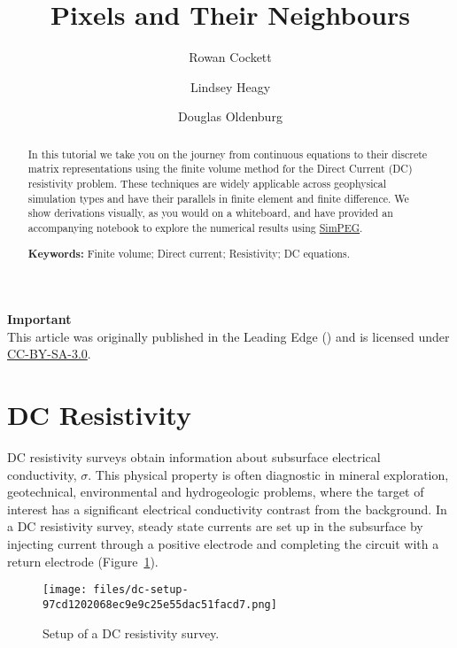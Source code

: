 \documentclass[Journal,InsideFigs,DoubleSpace,12pt,letterpaper]{ascelike-new}
\begin{document}
\title{Pixels and Their Neighbours}

\author[1]{Rowan Cockett}\author[1]{Lindsey Heagy}\author[1]{Douglas Oldenburg}

\maketitle

\begin{abstract}
In this tutorial we take you on the journey from continuous equations to their discrete matrix representations using the finite volume method for the Direct Current (DC) resistivity problem. These techniques are widely applicable across geophysical simulation types and have their parallels in finite element and finite difference. We show derivations visually, as you would on a whiteboard, and have provided an accompanying notebook to explore the numerical results using \href{http://simpeg.xyz/}{SimPEG}.

\noindent
\textbf{Keywords:} Finite volume; Direct current; Resistivity; DC equations.
\end{abstract}

\begin{framed}
\textbf{Important}\\
This article was originally published in the Leading Edge (\cite{Cockett_2016}) and is licensed under \href{https://creativecommons.org/licenses/by-sa/3.0/}{CC-BY-SA-3.0}.
\end{framed}

\section{DC Resistivity}\label{DC Resistivity}

DC resistivity surveys obtain information about subsurface electrical conductivity, $\sigma$. This physical property is often diagnostic in mineral exploration, geotechnical, environmental and hydrogeologic problems, where the target of interest has a significant electrical conductivity contrast from the background. In a DC resistivity survey, steady state currents are set up in the subsurface by injecting current through a positive electrode and completing the circuit with a return electrode (Figure~\ref{dc-setup}).

\begin{figure}[!htbp]
\centering
\texttt{[image: files/dc-setup-97cd1202068ec9e9c25e55dac51facd7.png]}
\caption{Setup of a DC resistivity survey.}
\label{dc-setup}
\end{figure}
\end{document}
